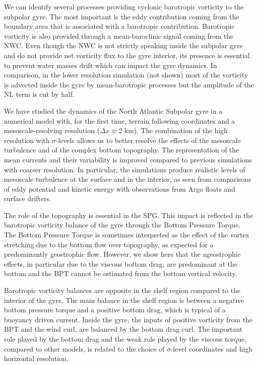 \documentclass[os, manuscript]{copernicus}
\begin{document}
We can identify several processes providing cyclonic barotropic vorticity to the subpolar gyre. The most important is the eddy contribution coming from the boundary area that is associated with a barotropic contribution. Barotropic vorticity is also provided through a mean-baroclinic signal coming from the NWC. Even though the NWC is not strictly speaking inside the subpolar gyre and do not provide net vorticity flux to the gyre interior, its presence is essential to prevent water masses drift which can impact the gyre dynamics. In comparison, in the lower resolution simulation (not shown) most of the vorticity is advected inside the gyre by mean-barotropic processes but the amplitude of the NL term is cut by half.
 

We have studied the dynamics of the North Atlantic Subpolar gyre in a numerical model with, for the first time, terrain following coordinates and a mesoscale-resolving resolution ($\Delta x \approx 2$ km). The combination of the high resolution with $\sigma$-levels allows us to better resolve the effects of the mesoscale turbulence and of the complex bottom topography. The representation of the mean currents and their variability is improved compared to previous simulations with coarser resolution. In particular, the simulations produce realistic levels of mesoscale turbulence at the surface and in the interior, as seen from comparisons of eddy potential and kinetic energy with observations from Argo floats and surface drifters.

The role of the topography is essential in the SPG. This impact is reflected in the barotropic vorticity balance of the gyre through the Bottom Pressure Torque. The Bottom Pressure Torque is sometimes interpreted as the effect of the vortex stretching due to the bottom flow over topography, as expected for a predominantly geostrophic flow. However, we show here that the ageostrophic effects, in particular due to the viscous bottom drag, are predominant at the bottom and the BPT cannot be estimated from the bottom vertical velocity. 

Barotropic vorticity balances are opposite in the shelf region compared to the interior of the gyre. The main balance in the shelf region is between a negative bottom pressure torque and a positive bottom drag, which is typical of a buoyancy driven current. Inside the gyre, the inputs of positive vorticity from the BPT and the wind curl, are balanced by the bottom drag curl. The important role played by the bottom drag and the weak role played by the viscous torque, compared to other models, is related to the choice of $\sigma$-level coordinates and high horizontal resolution. 
\end{document}
